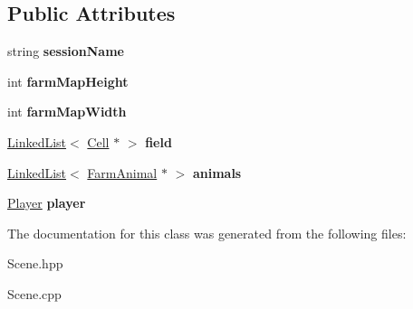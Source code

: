 \subsection*{Public Attributes}
\begin{DoxyCompactItemize}
\item 
\mbox{\label{class_scene_a51c29c94c579798fbce6d5e3c3910731}} 
string {\bfseries session\+Name}
\item 
\mbox{\label{class_scene_a79492c02654be753565f32ccc04dbfc2}} 
int {\bfseries farm\+Map\+Height}
\item 
\mbox{\label{class_scene_a29f070e4ff6f9e75e3b486932df7672f}} 
int {\bfseries farm\+Map\+Width}
\item 
\mbox{\label{class_scene_a11b4590e22494d094335df2812a9cf1e}} 
\mbox{\hyperlink{class_linked_list}{Linked\+List}}$<$ \mbox{\hyperlink{class_cell}{Cell}} $\ast$ $>$ {\bfseries field}
\item 
\mbox{\label{class_scene_a2329f176f7007633b06e50722eb2a2f6}} 
\mbox{\hyperlink{class_linked_list}{Linked\+List}}$<$ \mbox{\hyperlink{class_farm_animal}{Farm\+Animal}} $\ast$ $>$ {\bfseries animals}
\item 
\mbox{\label{class_scene_a5908f97a4b71c31dc808b9a6d09bd9af}} 
\mbox{\hyperlink{class_player}{Player}} {\bfseries player}
\end{DoxyCompactItemize}


The documentation for this class was generated from the following files\+:\begin{DoxyCompactItemize}
\item 
Scene.\+hpp\item 
Scene.\+cpp\end{DoxyCompactItemize}
